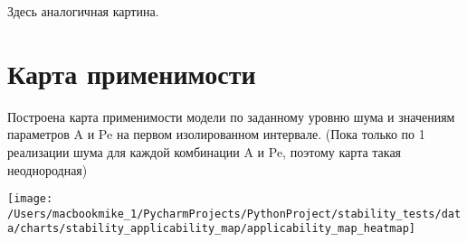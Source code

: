 \documentclass[12pt]{article}
\begin{document}
Здесь аналогичная картина.

\section*{Карта применимости}
    Построена карта применимости модели по заданному уровню шума и значениям параметров A и Pe на первом изолированном интервале.
    (Пока только по 1 реализации шума для каждой комбинации A и Pe, поэтому карта такая неоднородная)

\begin{center}
    \texttt{[image: /Users/macbookmike\_1/PycharmProjects/PythonProject/stability\_tests/data/charts/stability\_applicability\_map/applicability\_map\_heatmap]}
\end{center}
\end{document}
